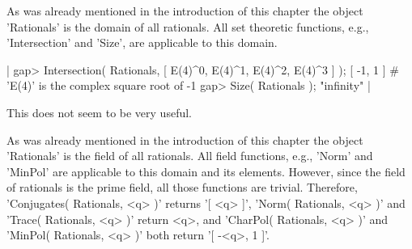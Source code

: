 %

As  was already mentioned in the introduction of this  chapter the {\GAP}
object 'Rationals' is the  domain of all  rationals.  All  set  theoretic
functions,  e.g.,  'Intersection'  and  'Size',  are  applicable to  this
domain.

|    gap> Intersection( Rationals, [ E(4)^0, E(4)^1, E(4)^2, E(4)^3 ] );
    [ -1, 1 ]    # 'E(4)' is the complex square root of -1
    gap> Size( Rationals );
    "infinity" |

This does not seem to be very useful.

%

As was already mentioned  in the introduction  of this chapter the {\GAP}
object 'Rationals'  is the field of all  rationals.  All field functions,
e.g., 'Norm' and 'MinPol' are applicable to this domain and its elements.
However, since  the field of  rationals  is the  prime  field, all  those
functions are trivial.  Therefore, 'Conjugates( Rationals, <q> )' returns
'[ <q> ]', 'Norm( Rationals, <q> )' and 'Trace(  Rationals, <q> )' return
<q>, and 'CharPol( Rationals, <q> )' and  'MinPol( Rationals, <q> )' both
return '[ -<q>, 1 ]'.




